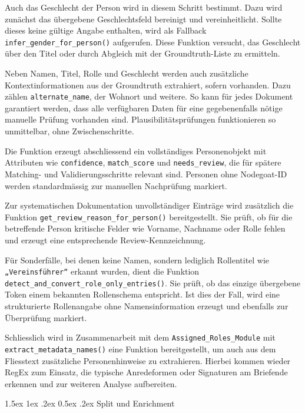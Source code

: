 \documentclass[12pt, a4paper, ngerman, bidi=default]{article}
\makeatletter
\newcommand{\code}[1]{\colorbox{VeryLightGray}{\texttt{#1}}} %
\let\oldparagraph\paragraph%
\renewcommand{\paragraph}{
    \@ifstar%
      \xxxParagraphStar%
      \xxxParagraphNoStar%
 }
\newcommand{\xxxParagraphStar}[1]{\oldparagraph*{#1}\mbox{}}
\newcommand{\xxxParagraphNoStar}[1]{\oldparagraph{#1}\mbox{}}
\renewcommand\paragraph{\@startsection{paragraph}{4}{0em}%
  {1.5ex \@plus1ex \@minus.2ex}%
  {0.5ex \@plus.2ex}%
  {\normalfont\normalsize\bfseries\itshape}}
\makeatother
\begin{document}
Auch das Geschlecht der Person wird in diesem Schritt bestimmt. Dazu wird zunächst das übergebene Geschlechtsfeld bereinigt und vereinheitlicht. Sollte dieses keine gültige Angabe enthalten, wird als Fallback \code{infer\_gender\_for\_person()} aufgerufen. Diese Funktion versucht, das Geschlecht über den Titel oder durch Abgleich mit der Groundtruth-Liste zu ermitteln.

Neben Namen, Titel, Rolle und Geschlecht werden auch zusätzliche Kontextinformationen aus der Groundtruth extrahiert, sofern vorhanden. Dazu zählen \code{alternate\_name}, der Wohnort und weitere. So kann für jedes Dokument garantiert werden, dass alle verfügbaren Daten für eine gegebenenfalls nötige manuelle Prüfung vorhanden sind. Plausibilitätsprüfungen funktionieren so unmittelbar, ohne Zwischenschritte.

Die Funktion erzeugt abschliessend ein vollständiges Personenobjekt mit Attributen wie \code{confidence}, \code{match\_score} und \code{needs\_review}, die für spätere Matching- und Validierungsschritte relevant sind. Personen ohne Nodegoat-ID werden standardmässig zur manuellen Nachprüfung markiert.

Zur systematischen Dokumentation unvollständiger Einträge wird zusätzlich die Funktion \code{get\_review\_reason\_for\_person()} bereitgestellt. Sie prüft, ob für die betreffende Person kritische Felder wie Vorname, Nachname oder Rolle fehlen und erzeugt eine entsprechende Review-Kennzeichnung. 

Für Sonderfälle, bei denen keine Namen, sondern lediglich Rollentitel wie \code{„Vereinsführer“} erkannt wurden, dient die Funktion \code{detect\_and\_convert\_role\_only\_entries()}. Sie prüft, ob das einzige übergebene Token einem bekannten Rollenschema entspricht. Ist dies der Fall, wird eine strukturierte Rollenangabe ohne Namensinformation erzeugt und ebenfalls zur Überprüfung markiert.

Schliesslich wird in Zusammenarbeit mit dem \code{Assigned\_Roles\_Module} mit \code{extract\_metadata\_names()} eine Funktion bereitgestellt, um auch aus dem Fliesstext zusätzliche Personenhinweise zu extrahieren. Hierbei kommen wieder RegEx zum Einsatz, die typische Anredeformen oder Signaturen am Briefende erkennen und zur weiteren Analyse aufbereiten.




\paragraph{ Split und Enrichment}\label{paragraph:Pers_match/Split&Enrich}
\end{document}
